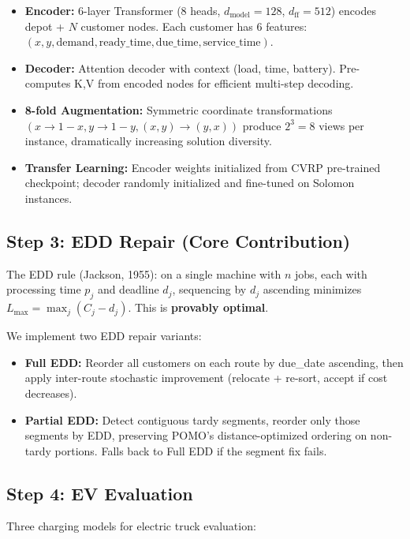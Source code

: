 \documentclass[11pt,a4paper]{article}
\begin{document}
\begin{itemize}[nosep]
    \item \textbf{Encoder:} 6-layer Transformer (8 heads, $d_{\text{model}}=128$, $d_{\text{ff}}=512$) encodes depot + $N$ customer nodes. Each customer has 6 features: $(x, y, \text{demand}, \text{ready\_time}, \text{due\_time}, \text{service\_time})$.
    \item \textbf{Decoder:} Attention decoder with context (load, time, battery). Pre-computes K,V from encoded nodes for efficient multi-step decoding.
    \item \textbf{8-fold Augmentation:} Symmetric coordinate transformations $(x \rightarrow 1-x, y \rightarrow 1-y, (x,y) \rightarrow (y,x))$ produce $2^3 = 8$ views per instance, dramatically increasing solution diversity.
    \item \textbf{Transfer Learning:} Encoder weights initialized from CVRP pre-trained checkpoint; decoder randomly initialized and fine-tuned on Solomon instances.
\end{itemize}

\subsection{Step 3: EDD Repair (Core Contribution)}
The EDD rule (Jackson, 1955): on a single machine with $n$ jobs, each with
processing time $p_j$ and deadline $d_j$, sequencing by $d_j$ ascending
minimizes $L_{\max} = \max_j(C_j - d_j)$. This is \textbf{provably optimal}.

We implement two EDD repair variants:

\begin{itemize}[nosep]
    \item \textbf{Full EDD:} Reorder all customers on each route by due\_date ascending, then apply inter-route stochastic improvement (relocate + re-sort, accept if cost decreases).
    \item \textbf{Partial EDD:} Detect contiguous tardy segments, reorder only those segments by EDD, preserving POMO's distance-optimized ordering on non-tardy portions. Falls back to Full EDD if the segment fix fails.
\end{itemize}

\subsection{Step 4: EV Evaluation}
Three charging models for electric truck evaluation:
\end{document}
